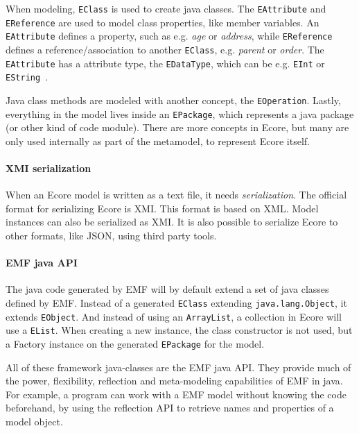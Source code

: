 When modeling, \texttt{EClass} is used to create java classes.
The \texttt{EAttribute} and \texttt{EReference} are used to model class properties, like member variables.
An \texttt{EAttribute} defines a property, such as e.g. \textit{age} or \textit{address}, while \texttt{EReference} defines a reference/association to another \texttt{EClass}, e.g. \textit{parent} or \textit{order}.
The \texttt{EAttribute} has a attribute type, the \texttt{EDataType}, which can be e.g. \texttt{EInt} or \texttt{EString}~\cite{edmerksEMFEclipseModeling2009}.

Java class methods are modeled with another concept, the \texttt{EOperation}.
Lastly, everything in the model lives inside an \texttt{EPackage}, which represents a java package (or other kind of code module).
There are more concepts in \gls{Ecore}, but many are only used internally as part of the metamodel, to represent \gls{Ecore} itself.


\paragraph{\Acrshort{XMI} serialization}
When an \gls{Ecore} model is written as a text file, it needs \textit{serialization}.
The official format for serializing Ecore is \acrfull{XMI}.
This format is based on \acrfull{XML}.
Model instances can also be serialized as \acrshort{XMI}.
It is also possible to serialize \gls{Ecore} to other formats, like \gls{JSON}, using third party tools.

\paragraph{\acrshort{EMF} java \acrshort{API}}
The java code generated by \acrshort{EMF} will by default extend a set of java classes defined by \acrshort{EMF}.
Instead of a generated \texttt{EClass} extending \texttt{java.lang.Object}, it extends \texttt{EObject}.
And instead of using an \texttt{ArrayList}, a collection in \gls{Ecore} will use a \texttt{EList}.
When creating a new instance, the class constructor is not used, but a Factory instance on the generated \texttt{EPackage} for the model.


All of these framework java-classes are the \acrshort{EMF} java \gls{API}.
They provide much of the power, flexibility, reflection and meta-modeling capabilities of \acrshort{EMF} in java.
For example, a program can work with a \acrshort{EMF} model without knowing the code beforehand, by using the reflection \acrshort{API} to retrieve names and properties of a model object.



